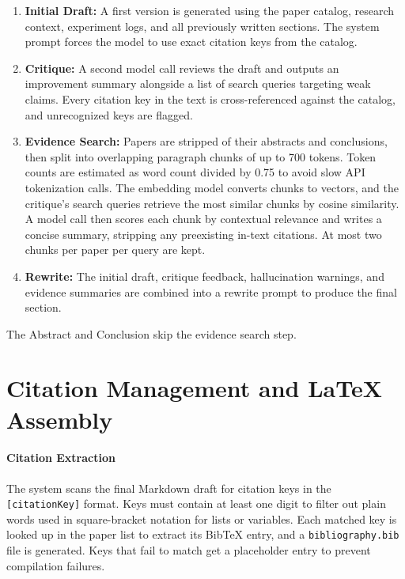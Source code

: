\begin{enumerate}[nosep]
	\item \textbf{Initial Draft:} A first version is generated using the paper catalog, research context, experiment logs, and all previously written sections. The system prompt forces the model to use exact citation keys from the catalog.
	\item \textbf{Critique:} A second model call reviews the draft and outputs an improvement summary alongside a list of search queries targeting weak claims. Every citation key in the text is cross-referenced against the catalog, and unrecognized keys are flagged.
	\item \textbf{Evidence Search:} Papers are stripped of their abstracts and conclusions, then split into overlapping paragraph chunks of up to 700 tokens. Token counts are estimated as word count divided by 0.75 to avoid slow API tokenization calls. The embedding model converts chunks to vectors, and the critique's search queries retrieve the most similar chunks by cosine similarity. A model call then scores each chunk by contextual relevance and writes a concise summary, stripping any preexisting in-text citations. At most two chunks per paper per query are kept.
	\item \textbf{Rewrite:} The initial draft, critique feedback, hallucination warnings, and evidence summaries are combined into a rewrite prompt to produce the final section.
\end{enumerate}

The Abstract and Conclusion skip the evidence search step.




\section{Citation Management and \LaTeX{} Assembly}

\paragraph{Citation Extraction}
The system scans the final Markdown draft for citation keys in the \texttt{[citationKey]} format.
Keys must contain at least one digit to filter out plain words used in square-bracket notation for lists or variables.
Each matched key is looked up in the paper list to extract its BibTeX entry, and a \texttt{bibliography.bib} file is generated.
Keys that fail to match get a placeholder entry to prevent compilation failures.

